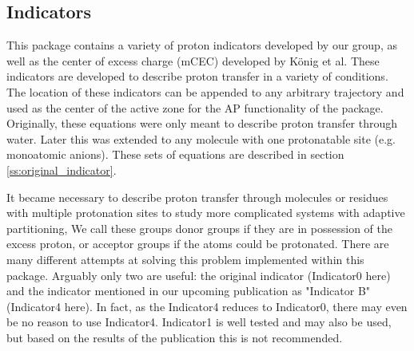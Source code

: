 \documentclass{article}
\begin{document}
\subsection{Indicators}
This package contains a variety of proton indicators developed by our group,\cite{Wu2013,Pezeshki2015} as well as the center of excess charge (mCEC) developed by K\"onig et al.\cite{Konig2006}
These indicators are developed to describe proton transfer in a variety of conditions.
The location of these indicators can be appended to any arbitrary trajectory and used as the center of the active zone for the AP functionality of the package.
Originally, these equations were only meant to describe proton transfer through water.\cite{Wu2013,Pezeshki2015}
Later this was extended to any molecule with one protonatable site (e.g. monoatomic anions).\cite{Garza2019}
These sets of equations are described in section \ref{ss:original_indicator}.

It became necessary to describe proton transfer through molecules or residues with multiple protonation sites to study more complicated systems with adaptive partitioning, 
We call these groups donor groups if they are in possession of the excess proton, or acceptor groups if the atoms could be protonated. 
There are many different attempts at solving this problem implemented within this package.
Arguably only two are useful: the original indicator (Indicator0 here) and the indicator mentioned in our upcoming publication as "Indicator B" (Indicator4 here).
In fact, as the Indicator4 reduces to Indicator0, there may even be no reason to use Indicator4.
Indicator1 is well tested and may also be used, but based on the results of the publication this is not recommended.
\end{document}
